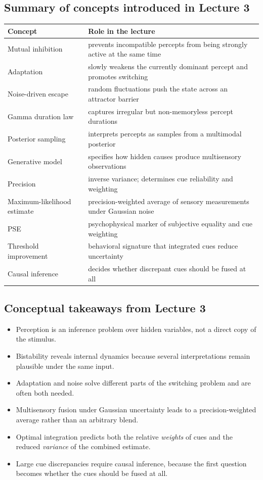 \subsection{Summary of concepts introduced in Lecture 3}

\begin{center}
\begin{tabular}{lp{}}
\hline
Concept & Role in the lecture \\
\hline
Mutual inhibition & prevents incompatible percepts from being strongly active at the same time \\
Adaptation & slowly weakens the currently dominant percept and promotes switching \\
Noise-driven escape & random fluctuations push the state across an attractor barrier \\
Gamma duration law & captures irregular but non-memoryless percept durations \\
Posterior sampling & interprets percepts as samples from a multimodal posterior \\
Generative model & specifies how hidden causes produce multisensory observations \\
Precision & inverse variance; determines cue reliability and weighting \\
Maximum-likelihood estimate & precision-weighted average of sensory measurements under Gaussian noise \\
PSE & psychophysical marker of subjective equality and cue weighting \\
Threshold improvement & behavioral signature that integrated cues reduce uncertainty \\
Causal inference & decides whether discrepant cues should be fused at all \\
\hline
\end{tabular}
\end{center}

\subsection{Conceptual takeaways from Lecture 3}

\begin{itemize}
    \item Perception is an inference problem over hidden variables, not a direct copy of the stimulus.
    \item Bistability reveals internal dynamics because several interpretations remain plausible under the same input.
    \item Adaptation and noise solve different parts of the switching problem and are often both needed.
    \item Multisensory fusion under Gaussian uncertainty leads to a precision-weighted average rather than an arbitrary blend.
    \item Optimal integration predicts both the relative \emph{weights} of cues and the reduced \emph{variance} of the combined estimate.
    \item Large cue discrepancies require causal inference, because the first question becomes whether the cues should be fused at all.
\end{itemize}

